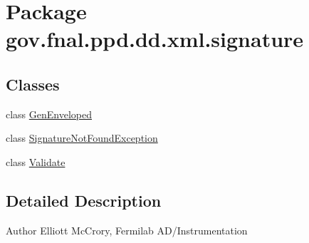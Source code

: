 \hypertarget{namespacegov_1_1fnal_1_1ppd_1_1dd_1_1xml_1_1signature}{\section{Package gov.\-fnal.\-ppd.\-dd.\-xml.\-signature}
\label{namespacegov_1_1fnal_1_1ppd_1_1dd_1_1xml_1_1signature}
}
\subsection*{Classes}
\begin{DoxyCompactItemize}
\item 
class \hyperlink{classgov_1_1fnal_1_1ppd_1_1dd_1_1xml_1_1signature_1_1GenEnveloped}{Gen\-Enveloped}
\item 
class \hyperlink{classgov_1_1fnal_1_1ppd_1_1dd_1_1xml_1_1signature_1_1SignatureNotFoundException}{Signature\-Not\-Found\-Exception}
\item 
class \hyperlink{classgov_1_1fnal_1_1ppd_1_1dd_1_1xml_1_1signature_1_1Validate}{Validate}
\end{DoxyCompactItemize}


\subsection{Detailed Description}
\begin{DoxyAuthor}{Author}
Elliott Mc\-Crory, Fermilab A\-D/\-Instrumentation 
\end{DoxyAuthor}
